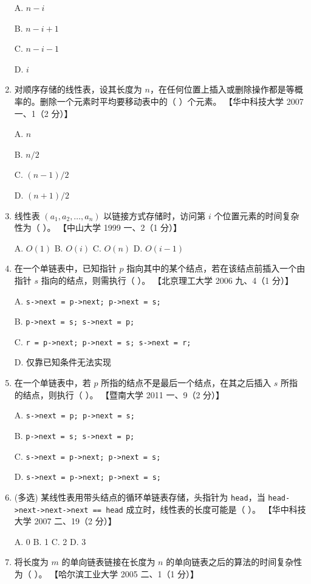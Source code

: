 \documentclass[lang=cn,newtx,10pt,scheme=chinese]{elegantbook}
\begin{document}
\begin{enumerate}
    A. $n-i$  

    B. $n-i+1$  

    C. $n-i-1$  

    D. $i$  

    \item 对顺序存储的线性表，设其长度为 $n$，在任何位置上插入或删除操作都是等概率的。删除一个元素时平均要移动表中的（ ）个元素。  
    【华中科技大学 2007 一、1（2 分）】  

    A. $n$  

    B. $n/2$  

    C. $(n-1)/2$  

    D. $(n+1)/2$ 

    \item 线性表 $(a_1, a_2, \dots, a_n)$ 以链接方式存储时，访问第 $i$ 个位置元素的时间复杂性为（ ）。  
    【中山大学 1999 一、2（1 分）】 

    A. $O(1)$ \quad B. $O(i)$ \quad C. $O(n)$ \quad D. $O(i-1)$  

    \item 在一个单链表中，已知指针 $p$ 指向其中的某个结点，若在该结点前插入一个由指针 $s$ 指向的结点，则需执行（ ）。  
    【北京理工大学 2006 九、4（1 分）】  

    A. \texttt{s->next = p->next; p->next = s;}  

    B. \texttt{p->next = s; s->next = p;}  

    C. \texttt{r = p->next; p->next = s; s->next = r;}  

    D. 仅靠已知条件无法实现  

    \item 在一个单链表中，若 $p$ 所指的结点不是最后一个结点，在其之后插入 $s$ 所指的结点，则执行（ ）。  
    【暨南大学 2011 一、9（2 分）】  

    A. \texttt{s->next = p; p->next = s;}  

    B. \texttt{p->next = s; s->next = p;}  

    C. \texttt{s->next = p->next; p->next = s;}  

    D. \texttt{s->next = p->next; p->next = s;}  

    \item (多选) 某线性表用带头结点的循环单链表存储，头指针为 \texttt{head}，当 \texttt{head->next->next->next == head} 成立时，线性表的长度可能是（ ）。  
    【华中科技大学 2007 二、19（2 分）】  

    A. 0 \quad B. 1 \quad C. 2 \quad D. 3  

    \item 将长度为 $m$ 的单向链表链接在长度为 $n$ 的单向链表之后的算法的时间复杂性为（ ）。  
    【哈尔滨工业大学 2005 二、1（1 分）】 


\end{enumerate}
\end{document}
